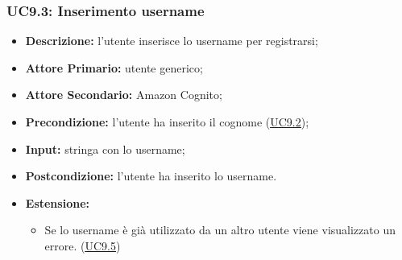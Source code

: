 \subsubsection{UC9.3: Inserimento username}
\label{sec:UC9.3}
\begin{itemize}
    \item \textbf{Descrizione:} l'utente inserisce lo username per registrarsi;
    \item \textbf{Attore Primario:} utente generico;
    \item \textbf{Attore Secondario:} Amazon Cognito;
    \item \textbf{Precondizione:} l'utente ha inserito il cognome (\hyperref[sec:UC9.2]{\underline{UC9.2}});
    \item \textbf{Input:} stringa con lo username;
    \item \textbf{Postcondizione:} l'utente ha inserito lo username.
    \item \textbf{Estensione:}
          \begin{itemize}
              \item Se lo username è già utilizzato da un altro utente viene visualizzato un errore. (\hyperref[sec:UC9.5]{\underline{UC9.5}})
          \end{itemize}
\end{itemize}


